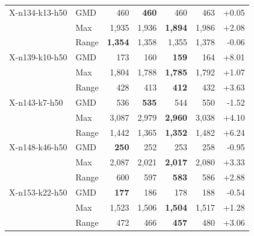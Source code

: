 \begin{small}
\begin{longtable}{llrrrrr}
X-n134-k13-h50 & GMD & 460 & \textbf{460} & 460 & 463 & +0.05 \\
 & Max & 1,935 & 1,936 & \textbf{1,894} & 1,986 & +2.08 \\
 & Range & \textbf{1,354} & 1,358 & 1,355 & 1,378 & -0.06 \\
X-n139-k10-h50 & GMD & 173 & 160 & \textbf{159} & 164 & +8.01 \\
 & Max & 1,804 & 1,788 & \textbf{1,785} & 1,792 & +1.07 \\
 & Range & 428 & 413 & \textbf{412} & 432 & +3.63 \\
X-n143-k7-h50 & GMD & 536 & \textbf{535} & 544 & 550 & -1.52 \\
 & Max & 3,087 & 2,979 & \textbf{2,960} & 3,038 & +4.10 \\
 & Range & 1,442 & 1,365 & \textbf{1,352} & 1,482 & +6.24 \\
X-n148-k46-h50 & GMD & \textbf{250} & 252 & 253 & 258 & -0.95 \\
 & Max & 2,087 & 2,021 & \textbf{2,017} & 2,080 & +3.33 \\
 & Range & 600 & 597 & \textbf{583} & 586 & +2.88 \\
X-n153-k22-h50 & GMD & \textbf{177} & 186 & 178 & 188 & -0.54 \\
 & Max & 1,523 & 1,506 & \textbf{1,504} & 1,517 & +1.28 \\
 & Range & 472 & 466 & \textbf{457} & 480 & +3.06 \\
\end{longtable}
\end{small}

